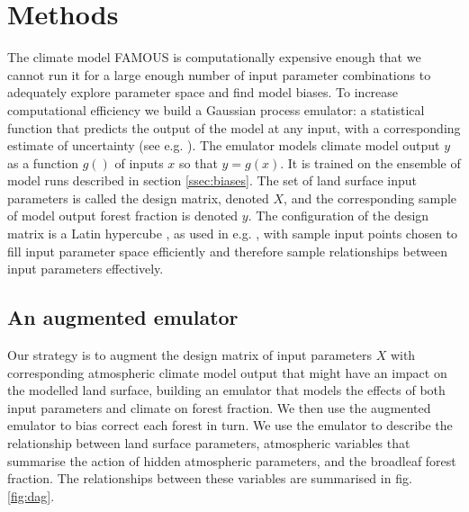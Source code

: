 \documentclass[gmd, manuscript]{copernicus}
\begin{document}
\section{Methods}\label{sec:methods}
The climate model FAMOUS is computationally expensive enough that we cannot run it for a large enough number of input parameter combinations to adequately explore parameter space and find model biases. To increase computational efficiency we build a Gaussian process emulator: a statistical function that predicts the output of the model at any input, with a corresponding estimate of uncertainty (see e.g. \cite{sacks1989design, kennedy2001bayesian}). The emulator models climate model output $y$ as a function $g()$ of inputs $x$ so that $y = g(x)$. It is trained on the ensemble of model runs described in section \ref{ssec:biases}. The set of land surface input parameters is called the design matrix, denoted $X$, and the corresponding sample of model output forest fraction is denoted $y$. The configuration of the design matrix is a Latin hypercube \citep{mckay1979comparison}, as used in e.g. \cite{gregoire2010optimal,williams2013optimising}, with sample input points chosen to fill input parameter space efficiently and therefore sample relationships between input parameters effectively.

\subsection{An augmented emulator}\label{ssec:augmented}
Our strategy is to augment the design matrix of input parameters $X$ with corresponding atmospheric climate model output that might have an impact on the modelled land surface, building an emulator that models the effects of both input parameters and climate on forest fraction. We then use the augmented emulator to bias correct each forest in turn. We use the emulator to describe the relationship between land surface parameters, atmospheric variables that summarise the action of hidden atmospheric parameters, and the broadleaf forest fraction. The relationships between these variables are summarised in fig. \ref{fig:dag}. 
\end{document}
